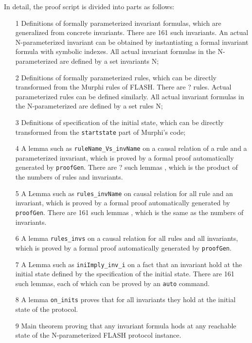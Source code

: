 \documentclass{llncs}
\begin{document}
In detail, the proof script is divided into   parts as follows:
\begin{enumerate}
\item[1] Definitions of formally parameterized invariant formulas, which are generalized from concrete invariants. There are 161 such invariants. An actual N-parameterized invariant can be obtained by instantiating a formal invariant formula with symbolic indexes. All   actual invariant formulas in the N-parameterized are defined by a set invariants N;

\item[2] Definitions of formally parameterized rules,  which can be directly transformed from the  Murphi rules of FLASH. There are ? rules.  Actual parameterized rules can be defined similarly. All actual invariant formulas in the N-parameterized are defined by a set rules N;

\item[3]  Definitions of specification of the initial state, which can be directly transformed from the {\tt startstate} part of Murphi's code;

\item[4] A lemma  such as {\tt ruleName\_Vs\_invName} on a causal relation of a rule and a parameterized invariant, which is proved by a formal proof automatically generated by {\tt proofGen}. There are ? such lemmas , which is the product of the numbers of rules and invariants.


\item[5]  A  Lemma  such as {\tt rules\_invName} on causal relation for  all rule and an invariant,  which is proved by a formal proof automatically generated by {\tt proofGen}. There are 161 such lemmas , which is the same as the numbers of  invariants.


\item[6] A lemma {\tt rules\_invs} on a causal relation for all rules and all invariants, which is proved by a formal proof automatically generated by {\tt proofGen}.

\item[7] A Lemma such as {\tt iniImply\_inv\_i} on a fact that an invariant  hold at the initial state defined by the specification of the initial state. There are 161 such lemmas, each of which can be proved by an {\tt auto} command.

\item[8] A lemma {\tt on\_inits} proves that for all invariants they hold at the initial state of the protocol.

\item[9] Main theorem  proving that any invariant formula  hods at any reachable state of the  N-parameterized FLASH protocol instance.
\end{enumerate}
\end{document}
